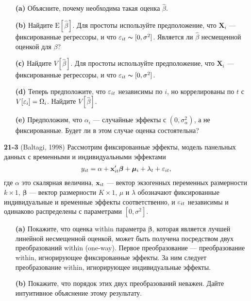 \begin{itemize}
\item[{\bf (a)}] Объясните, почему необходима такая оценка $\hat{\beta}$.

\item[{\bf (b)}] Найдите $\mathrm E[\hat{\beta}]$. Для простоты используйте предположение, что $\mathbf X_i$ --- фиксированные регрессоры, и что $\varepsilon_{it} \thicksim [0, \sigma^2]$. Является ли $\hat{\beta}$ несмещенной оценкой для $\beta$?

\item[{\bf (с)}] Найдите $V[\hat{\beta}]$. Для простоты используйте предположение, что $\mathbf X_i$ --- фиксированные регрессоры, и что $\varepsilon_{it} \thicksim [0, \sigma^2]$.

\item[{\bf (d)}] Теперь предположите, что $\varepsilon_{it}$ независимы по $i$, но коррелированы по $t$ с $V[\varepsilon_i]=\Omega_i$. Найдите $V[\hat{\beta}]$.

\item[{\bf (e)}] Предположим, что $\alpha_i$ --- случайные эффекты с $(0, \sigma^2_\alpha)$, а не фиксированные. Будет ли в этом случае оценка состоятельна?

\end{itemize}

\textbf{21-3} (Baltagi, 1998) Рассмотрим фиксированные эффекты, модель панельных данных с временными и индивидуальными эффектами
 \begin{align}
y_{it}=\alpha + \mathbf{x}'_{it} \bm\beta +\bm\mu_i+\lambda _t+\varepsilon_{it},
\nonumber
\end{align}
где $\alpha$  это скалярная величина, $\mathbf{x}_{it}$ --- вектор экзогенных переменных размерности $k \times 1$, $\bm\beta$ --- вектор размерности $K \times 1$, $\mu$ и $\lambda$ обозначают фиксированные индивидуальные и временные эффекты соответственно, и $\varepsilon_{it}$ независимы и одинаково распределены с параметрами $[0, \sigma^2]$.

\begin{itemize}
\item[{\bf (a)}] Покажите, что оценка within параметра $\bm\beta$, которая является лучшей линейной несмещенной оценкой, может быть получена посредством двух преобразований within (one-way). Первое преобразование --- преобразование within, игнорирующее фиксированные эффекты. За ним следует преобразование within, игнорирующее индивидуальные эффекты.

\item[{\bf (b)}]  Покажите, что порядок этих двух преобразований неважен. Дайте интуитивное объяснение этому результату.

\end{itemize}

